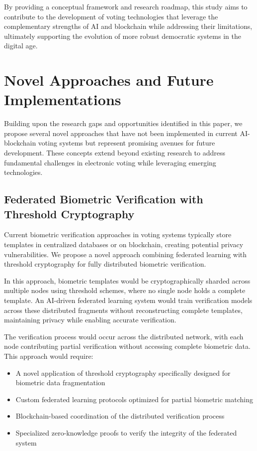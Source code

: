\documentclass[conference]{IEEEtran}
\begin{document}
By providing a conceptual framework and research roadmap, this study aims to contribute to the development of voting technologies that leverage the complementary strengths of AI and blockchain while addressing their limitations, ultimately supporting the evolution of more robust democratic systems in the digital age.

\section{Novel Approaches and Future Implementations}
Building upon the research gaps and opportunities identified in this paper, we propose several novel approaches that have not been implemented in current AI-blockchain voting systems but represent promising avenues for future development. These concepts extend beyond existing research to address fundamental challenges in electronic voting while leveraging emerging technologies.

\subsection{Federated Biometric Verification with Threshold Cryptography}
Current biometric verification approaches in voting systems typically store templates in centralized databases or on blockchain, creating potential privacy vulnerabilities. We propose a novel approach combining federated learning with threshold cryptography for fully distributed biometric verification.

In this approach, biometric templates would be cryptographically sharded across multiple nodes using threshold schemes, where no single node holds a complete template. An AI-driven federated learning system would train verification models across these distributed fragments without reconstructing complete templates, maintaining privacy while enabling accurate verification.

The verification process would occur across the distributed network, with each node contributing partial verification without accessing complete biometric data. This approach would require:

\begin{itemize}
    \item A novel application of threshold cryptography specifically designed for biometric data fragmentation
    \item Custom federated learning protocols optimized for partial biometric matching
    \item Blockchain-based coordination of the distributed verification process
    \item Specialized zero-knowledge proofs to verify the integrity of the federated system
\end{itemize}
\end{document}
